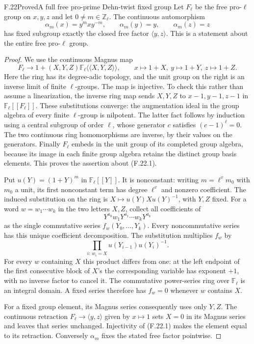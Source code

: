 \begin{statement}{F.22}{Proved}{A full free pro-prime Dehn-twist fixed group}
Let $F_\ell$ be the free pro-$\ell$ group on $x,y,z$ and let
$0\ne m\in\mathbb Z_\ell$.  The continuous automorphism
\[
 \alpha_m(x)=y^mxy^{-m},\qquad
 \alpha_m(y)=y,\qquad \alpha_m(z)=z
\]
has fixed subgroup exactly the closed free factor
$\langle y,z\rangle$.  This is a statement about the entire
free pro-$\ell$ group.
\end{statement}
\begin{proof}
We use the continuous Magnus map
\[
 F_\ell\longrightarrow
 1+(X,Y,Z)\mathbb F_\ell\langle\!\langle X,Y,Z\rangle\!\rangle,
 \qquad x\mapsto1+X,\ y\mapsto1+Y,\ z\mapsto1+Z.            \tag{F.22.1}
\]
Here the ring has its degree-adic topology, and the unit group
on the right is an inverse limit of finite $\ell$-groups.
The map is injective.  To check this rather than assume a
linearization, the inverse ring map sends $X,Y,Z$ to
$x-1,y-1,z-1$ in $\mathbb F_\ell[[F_\ell]]$.
These substitutions converge: the augmentation ideal in the
group algebra of every finite $\ell$-group is nilpotent.
The latter fact follows by induction using a central subgroup
of order $\ell$, whose generator $c$ satisfies $(c-1)^\ell=0$.
The two continuous ring homomorphisms are inverse, by their
values on the generators.  Finally $F_\ell$ embeds in the
unit group of its completed group algebra, because its image
in each finite group algebra retains the distinct group basis
elements.  This proves the assertion about (F.22.1).

Put $u(Y)=(1+Y)^m$ in $\mathbb F_\ell[[Y]]$.
It is nonconstant: writing $m=\ell^v m_0$ with $m_0$ a unit,
its first nonconstant term has degree $\ell^v$ and nonzero
coefficient.  The induced substitution on the ring is
$X\mapsto u(Y)Xu(Y)^{-1}$, with $Y,Z$ fixed.
For a word $w=w_1\cdots w_k$ in the two letters $X,Z$,
collect all coefficients of
\[
                  Y^{a_0}w_1Y^{a_1}\cdots w_kY^{a_k}
\]
as the single commutative series
$f_w(Y_0,\ldots,Y_k)$.  Every noncommutative series has this
unique coefficient decomposition.  The substitution multiplies
$f_w$ by
\[
        \prod_{i:\,w_i=X}u(Y_{i-1})u(Y_i)^{-1}.             \tag{F.22.2}
\]
For every $w$ containing $X$ this product differs from one:
at the left endpoint of the first consecutive block of $X$'s
the corresponding variable has exponent $+1$, with no inverse
factor to cancel it.  The commutative power-series ring over
$\mathbb F_\ell$ is an integral domain.  A fixed series therefore
has $f_w=0$ whenever $w$ contains $X$.

For a fixed group element, its Magnus series consequently uses
only $Y,Z$.  The continuous retraction
$F_\ell\to\langle y,z\rangle$ given by $x\mapsto1$ sets $X=0$
in its Magnus series and leaves that series unchanged.
Injectivity of (F.22.1) makes the element equal to its retraction.
Conversely $\alpha_m$ fixes the stated free factor pointwise.
\end{proof}

